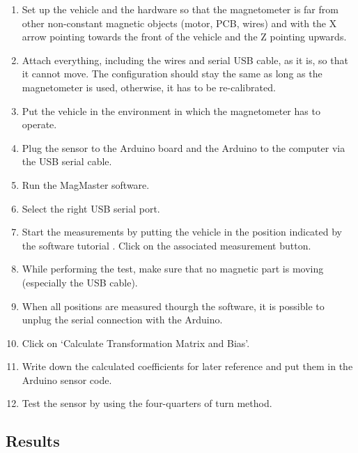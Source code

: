 \begin{enumerate}
  \item Set up the vehicle and the hardware so that the magnetometer is far from other non-constant magnetic objects (motor, PCB, wires) and with the X arrow pointing towards the front of the vehicle and the Z pointing upwards.
  \item Attach everything, including the wires and serial USB cable, as it is, so that it cannot move. The configuration should stay the same as long as the magnetometer is used, otherwise, it has to be re-calibrated.
  \item Put the vehicle in the environment in which the magnetometer has to operate.
  \item Plug the sensor to the Arduino board and the Arduino to the computer via the USB serial cable.
  \item Run the MagMaster software.
  \item Select the right USB serial port.
  \item Start the measurements by putting the vehicle in the position indicated by the software tutorial \cite{MagMaster}. Click on the associated measurement button.
  \item While performing the test, make sure that no magnetic part is moving (especially the USB cable).
  \item When all positions are measured thourgh the software, it is possible to unplug the serial connection with the Arduino.
  \item Click on `Calculate Transformation Matrix and Bias'.
  \item Write down the calculated coefficients for later reference and put them in the Arduino sensor code.
  \item Test the sensor by using the four-quarters of turn method.
\end{enumerate}

\subsection{Results} \label{magnetoCalibrationResults}


